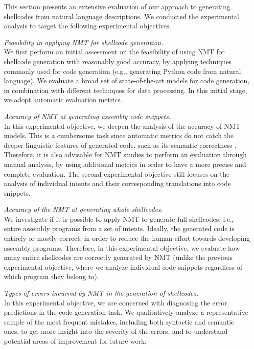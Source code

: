 This section presents an extensive evaluation of our approach to generating shellcodes from natural language descriptions. 
We conducted the experimental analysis to target the following experimental objectives.


\vspace{0.1cm}
\noindent
 \textit{Feasibility in applying NMT for shellcode generation.}\\
We first perform an initial assessment on the feasibility of using NMT for shellcode generation with reasonably good accuracy, by applying techniques commonly used for code generation (e.g., generating Python code from natural language). 
We evaluate a broad set of state-of-the-art models for code generation, in combination with different techniques for data processing. In this initial stage, we adopt automatic evaluation metrics.



\vspace{0.1cm}
\noindent
 \textit{Accuracy of NMT at generating assembly code snippets.}\\
In this experimental objective, we deepen the analysis of the accuracy of NMT models. 
This is a cumbersome task since automatic metrics do not catch the deeper linguistic features of generated code, such as its semantic correctness \cite{DBLP:journals/corr/abs-2105-03311}. Therefore, it is also advisable for NMT studies to perform an evaluation through manual analysis, by using additional metrics in order to have a more precise and complete evaluation. 
The second experimental objective still focuses on the analysis of individual intents and their corresponding translations into code snippets. 





\vspace{0.1cm}
\noindent
 \textit{Accuracy of the NMT at generating whole shellcodes.}\\
We investigate if it is possible to apply NMT to generate full shellcodes, i.e., entire assembly programs from a set of intents. 
Ideally, the generated code is entirely or mostly correct, in order to reduce the human effort towards developing assembly programs. 
Therefore, in this experimental objective, we evaluate how many entire shellcodes are correctly generated by NMT (unlike the previous experimental objective, where we analyze individual code snippets regardless of which program they belong to).


\vspace{0.1cm}
\noindent
 \textit{Types of errors incurred by NMT in the generation of shellcodes.}\\
In this experimental objective, we are concerned with diagnosing the error predictions in the code generation task. We qualitatively analyze a representative sample of the most frequent mistakes, including both syntactic and semantic ones, to get more insight into the severity of the errors, and to understand potential areas of improvement for future work.




